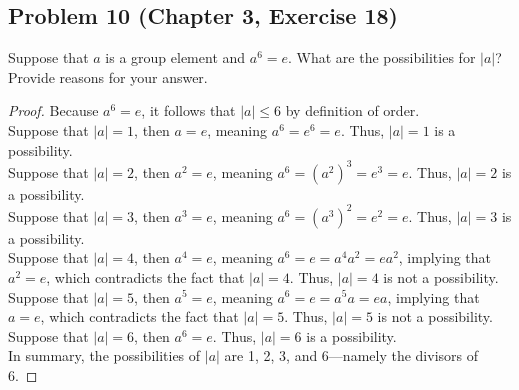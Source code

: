 \documentclass{article}
\begin{document}
\subsection*{Problem 10 (Chapter 3, Exercise 18)}
Suppose that $a$ is a group element and $a^6 = e$. What are the possibilities for $|a|$? Provide reasons for your answer.

\begin{proof}

Because $a^6 = e$, it follows that $|a| \leq 6$ by definition of order. \\
Suppose that $|a| = 1$, then $a = e$, meaning $a^6 = e^6 = e$. Thus, $|a| = 1$ is a possibility. \\ Suppose that $|a| = 2$, then $a^2 = e$, meaning $a^6 = (a^2)^3 = e^3 = e$. Thus, $|a| = 2$ is a possibility. \\
Suppose that $|a| = 3$, then $a^3 = e$, meaning $a^6 = (a^3)^2 = e^2 = e$. Thus, $|a| = 3$ is a possibility. \\
Suppose that $|a| = 4$, then $a^4 = e$, meaning $a^6 = e = a^4a^2 = ea^2$, implying that $a^2 = e$, which contradicts the fact that $|a| = 4$. Thus, $|a| = 4$ is not a possibility. \\
Suppose that $|a| = 5$, then $a^5 = e$, meaning $a^6 = e = a^5a = ea$, implying that $a = e$, which contradicts the fact that $|a| = 5$. Thus, $|a| = 5$ is not a possibility. \\
Suppose that $|a| = 6$, then $a^6 = e$. Thus, $|a| = 6$ is a possibility. \\

In summary, the possibilities of $|a|$ are 1, 2, 3, and 6—namely the divisors of 6.
\end{proof}
\end{document}
